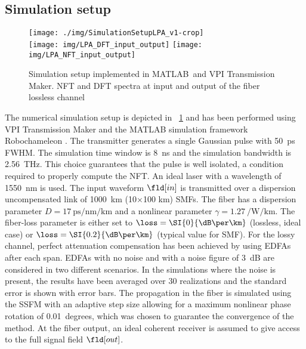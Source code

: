 \subsection{Simulation setup}
%
\begin{figure}[t]
  \centering
  \texttt{[image: ./img/SimulationSetupLPA\_v1-crop]}
  \\
  \vspace{4mm}
  \texttt{[image: img/LPA\_DFT\_input\_output]}
   \texttt{[image: img/LPA\_NFT\_input\_output]}
  \caption{ Simulation setup implemented in {MATLAB\texttrademark}~and {VPI
Transmission Maker\texttrademark}. 
 \ac{NFT} and \ac{DFT} spectra at input and output of the fiber lossless
channel}
  \label{fig:setup}
\end{figure}
The numerical simulation setup is depicted in  \figurename~\ref{fig:setup}
and has been performed using {VPI Transmission
Maker\texttrademark} and the {MATLAB\texttrademark} simulation framework Robochameleon \cite{robochameleonGit}. The transmitter generates a single Gaussian pulse with \SI{50}
{ps} \ac{FWHM}. The simulation time window is \SI{8}{\ns} and the
simulation bandwidth is \SI{2.56}{\THz}. This choice guarantees that the pulse is well isolated, a condition required to properly compute the \ac{NFT}. An ideal laser with a
wavelength of \SI{1550}{\nm} is used. The input waveform $\fld[in]$ is
transmitted over a dispersion uncompensated link of \SI{1000}{km} (10$\times$100 \si{km}) \acp{SMF}. The
fiber has a dispersion parameter $D = \SI{17}{\ps\per\nm\per\km}$ and a nonlinear
parameter $\gamma = \SI[per-mode=reciprocal]{1.27}{\per\W\per\km}$. The fiber-loss parameter is either set to $\loss = \SI{0}{\dB\per\km}$ (lossless, ideal case) or $\loss =
\SI{0.2}{\dB\per\km}$ (typical value for \ac{SMF}). For the lossy channel, perfect attenuation
compensation has been achieved by using \acp{EDFA}
after each span. \acp{EDFA} with no noise and with a noise figure of 3~dB are
considered in two different scenarios. In the simulations where the noise is
present, the results have been averaged over 30 realizations and the standard
error is shown with error bars. The propagation in the fiber is simulated using
the \ac{SSFM} with an adaptive step size allowing for a
maximum nonlinear phase rotation of \SI{0.01}{degrees}, which was chosen to guarantee the convergence of the method. At the fiber output, an ideal coherent
receiver is assumed to give access to the full signal field $\fld[out]$.

